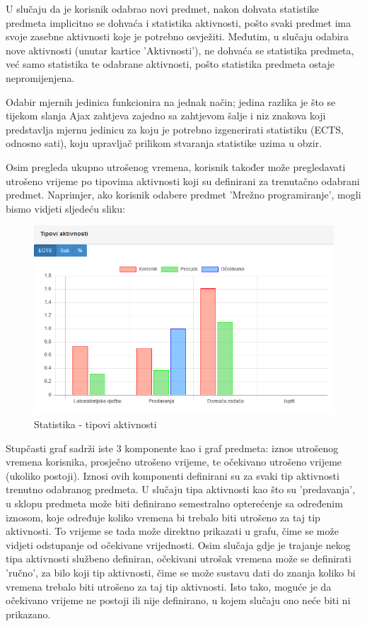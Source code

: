 \documentclass[times, utf8, zavrsni]{fer}
\begin{document}
U slučaju da je korisnik odabrao novi predmet, nakon dohvata statistike predmeta implicitno se dohvaća i statistika aktivnosti, pošto svaki predmet ima svoje zasebne aktivnosti koje je potrebno osvježiti. Međutim, u slučaju odabira nove aktivnosti (unutar kartice 'Aktivnosti'), ne dohvaća se statistika predmeta, već samo statistika te odabrane aktivnosti, pošto statistika predmeta ostaje nepromijenjena.

Odabir mjernih jedinica funkcionira na jednak način; jedina razlika je što se tijekom slanja Ajax zahtjeva zajedno sa zahtjevom šalje i niz znakova koji predstavlja mjernu jedinicu za koju je potrebno izgenerirati statistiku (ECTS, odnosno sati), koju upravljač prilikom stvaranja statistike uzima u obzir.

\lstset{style=js}


Osim pregleda ukupno utrošenog vremena, korisnik također može pregledavati utrošeno vrijeme po tipovima aktivnosti koji su definirani za trenutačno odabrani predmet. Naprimjer, ako korisnik odabere predmet 'Mrežno programiranje', mogli bismo vidjeti sljedeću sliku:

\begin{figure}[H]
\centering
\includegraphics[width=\textwidth,height=\textheight,keepaspectratio]{img/statistika-tip-aktivnosti.png}
\caption{Statistika - tipovi aktivnosti}
\label{fig:statistika-tip-aktivnosti}
\end{figure}

Stupčasti graf sadrži iste 3 komponente kao i graf predmeta: iznos utrošenog vremena korisnika, prosječno utrošeno vrijeme, te očekivano utrošeno vrijeme (ukoliko postoji). Iznosi ovih komponenti definirani su za svaki tip aktivnosti trenutno odabranog predmeta. U slučaju tipa aktivnosti kao što su 'predavanja', u sklopu predmeta može biti definirano semestralno opterećenje sa određenim iznosom, koje određuje koliko vremena bi trebalo biti utrošeno za taj tip aktivnosti. To vrijeme se tada može direktno prikazati u grafu, čime se može vidjeti odstupanje od očekivane vrijednosti. Osim slučaja gdje je trajanje nekog tipa aktivnosti službeno definiran, očekivani utrošak vremena može se definirati 'ručno', za bilo koji tip aktivnosti, čime se može sustavu dati do znanja koliko bi vremena trebalo biti utrošeno za taj tip aktivnosti. Isto tako, moguće je da očekivano vrijeme ne postoji ili nije definirano, u kojem slučaju ono neće biti ni prikazano.
\end{document}
